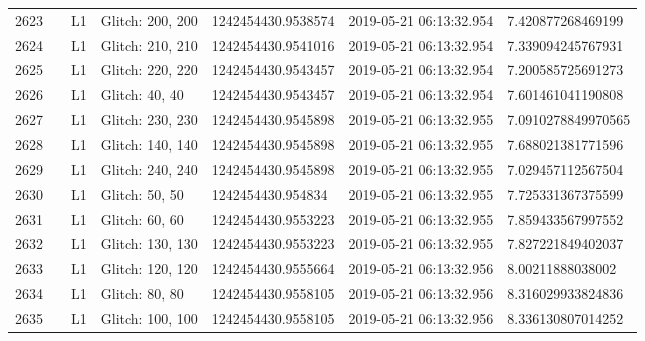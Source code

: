 \begin{longtable}{lllllll}
2623 &                                                    &       L1 &  Glitch: 200, 200 &  1242454430.9538574 &  2019-05-21 06:13:32.954 &   7.420877268469199 \\
2624 &                                                    &       L1 &  Glitch: 210, 210 &  1242454430.9541016 &  2019-05-21 06:13:32.954 &   7.339094245767931 \\
2625 &                                                    &       L1 &  Glitch: 220, 220 &  1242454430.9543457 &  2019-05-21 06:13:32.954 &   7.200585725691273 \\
2626 &                                                    &       L1 &    Glitch: 40, 40 &  1242454430.9543457 &  2019-05-21 06:13:32.954 &   7.601461041190808 \\
2627 &                                                    &       L1 &  Glitch: 230, 230 &  1242454430.9545898 &  2019-05-21 06:13:32.955 &  7.0910278849970565 \\
2628 &                                                    &       L1 &  Glitch: 140, 140 &  1242454430.9545898 &  2019-05-21 06:13:32.955 &   7.688021381771596 \\
2629 &                                                    &       L1 &  Glitch: 240, 240 &  1242454430.9545898 &  2019-05-21 06:13:32.955 &   7.029457112567504 \\
2630 &                                                    &       L1 &    Glitch: 50, 50 &   1242454430.954834 &  2019-05-21 06:13:32.955 &   7.725331367375599 \\
2631 &                                                    &       L1 &    Glitch: 60, 60 &  1242454430.9553223 &  2019-05-21 06:13:32.955 &   7.859433567997552 \\
2632 &                                                    &       L1 &  Glitch: 130, 130 &  1242454430.9553223 &  2019-05-21 06:13:32.955 &   7.827221849402037 \\
2633 &                                                    &       L1 &  Glitch: 120, 120 &  1242454430.9555664 &  2019-05-21 06:13:32.956 &    8.00211888038002 \\
2634 &                                                    &       L1 &    Glitch: 80, 80 &  1242454430.9558105 &  2019-05-21 06:13:32.956 &   8.316029933824836 \\
2635 &                                                    &       L1 &  Glitch: 100, 100 &  1242454430.9558105 &  2019-05-21 06:13:32.956 &   8.336130807014252 \\

\end{longtable}
